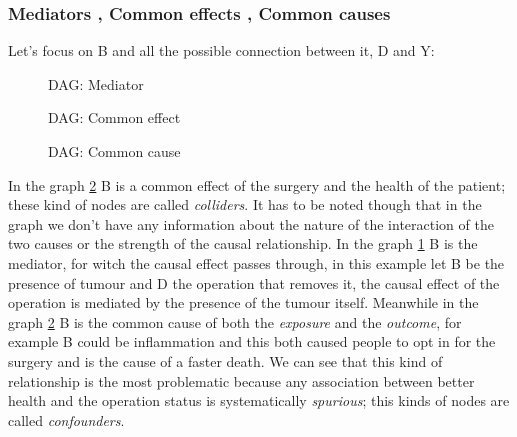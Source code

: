 \subsubsection{Mediators , Common effects , Common causes }
Let's focus on B and all the possible connection between it, D and Y:
\begin{figure}[H]
	\centering
\caption{DAG: Mediator}
\label{DAG:Mediator}
\end{figure} 
\begin{figure}[H]
\centering    
\caption{DAG: Common effect}
\label{DAG:Common effect}
\end{figure} 
\begin{figure}[H]
	\centering
\caption{DAG: Common cause}
\label{DAG:Common cause}
\end{figure}
In the graph \ref{DAG:Common effect} B is a common effect of the surgery and the health of the patient; these kind of nodes are called \textit{colliders}.  It has to be noted though that in the graph we don't have any information about the nature of the interaction of the two causes or the strength of the causal relationship.
In the graph \ref{DAG:Mediator} B is the mediator, for witch the causal effect passes through, in this example let B be the presence of tumour and D the operation that removes it, the causal effect of the operation is mediated by the presence of the tumour itself. 
Meanwhile in the graph \ref{DAG:Common effect} B is the common cause of both the \textit{exposure} and the \textit{outcome}, for example B could be inflammation and this both caused people to opt in for the surgery and is the cause of a faster death. We can see that this kind of relationship is the most problematic because any association between better health and the operation status is systematically \textit{spurious}; this kinds of nodes are called \textit{confounders}.
